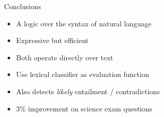 \def\title{Conclusions}
\begin{frame}{\title}
\begin{itemize}
\item A logic over the syntax of natural language
\item Expressive but efficient
\end{itemize}

\begin{itemize}
\item Both operate directly over text
\item Use lexical classifier as evaluation function
\end{itemize}


\begin{itemize}
\item Also detects \textit{likely} entailment / contradictions
\item 3\% improvement on science exam questions
\end{itemize}
\end{frame}



